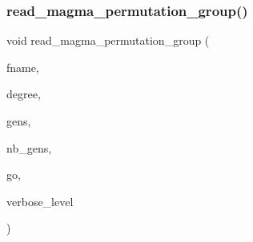 \subsubsection{\texorpdfstring{read\+\_\+magma\+\_\+permutation\+\_\+group()}{read\_magma\_permutation\_group()}}
{\footnotesize\ttfamily void read\+\_\+magma\+\_\+permutation\+\_\+group (\begin{DoxyParamCaption}\item[{const \mbox{\hyperlink{galois_8h_ab6cc7b4aeb6ea31aba2b3fbfc83ff5e6}{B\+Y\+TE}} $\ast$}]{fname,  }\item[{\mbox{\hyperlink{galois_8h_a09fddde158a3a20bd2dcadb609de11dc}{I\+NT}}}]{degree,  }\item[{\mbox{\hyperlink{galois_8h_a09fddde158a3a20bd2dcadb609de11dc}{I\+NT}} $\ast$\&}]{gens,  }\item[{\mbox{\hyperlink{galois_8h_a09fddde158a3a20bd2dcadb609de11dc}{I\+NT}} \&}]{nb\+\_\+gens,  }\item[{\mbox{\hyperlink{galois_8h_a09fddde158a3a20bd2dcadb609de11dc}{I\+NT}} \&}]{go,  }\item[{\mbox{\hyperlink{galois_8h_a09fddde158a3a20bd2dcadb609de11dc}{I\+NT}}}]{verbose\+\_\+level }\end{DoxyParamCaption})}

